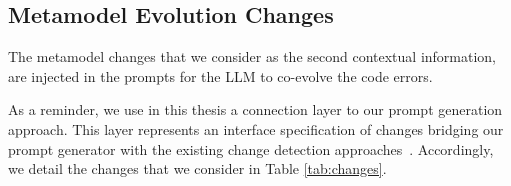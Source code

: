 



\subsection{Metamodel Evolution Changes}
The metamodel changes that we consider as the second contextual information, are injected in the prompts for the LLM to co-evolve the code errors. 

As a reminder, we use in this thesis a connection layer to our prompt generation approach.  This layer represents an interface specification of changes {\small{}} bridging our prompt generator with the existing change detection approaches~\cite{Alter2015, williams2012searching,cicchetti_managing_2009,langer_posteriori_2013,vermolen_reconstructing_2012,Khelladi2016}.
Accordingly, we detail the changes that we consider in Table \ref{tab:changes}. 
%

